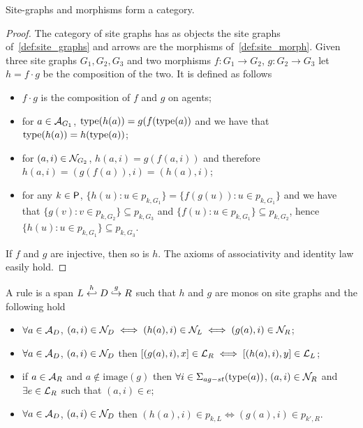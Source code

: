 \begin{lemma}
  Site-graphs and morphisms form a category.
\end{lemma}
\begin{proof}
  The category of site graphs has as objects the site graphs of~\autoref{def:site_graphs} and arrows are the morphisms of~\autoref{def:site_morph}.
%
  Given three site graphs $G_1,G_2,G_3$ and two morphisms $f:G_1\to G_2$, $g:G_2\to G_3$ let $h=f\cdot g$ be the composition of the two. It is defined as follows
  \begin{itemize}
  \item $f\cdot g$ is the composition of $f$ and $g$ on agents;
  \item for $a\in\mathcal{A}_{G_1}$, $\operatorname{type}(h(a))=g(f(\operatorname{type}(a))$ and we have that $\operatorname{type}(h(a))=h(\operatorname{type}(a))$;
  \item for $(a,i)\in\mathcal{N}_{G_2}$, $h(a,i) = g(f(a,i))$ and therefore $h(a,i)=(g(f(a)),i)=(h(a),i)$;
  \item for any $k\in\mathsf{P}$, $\{h(u): u\in p_{k,G_1}\}=\{f(g(u)): u\in p_{k,G_1}\}$ and we have that $\{g(v): v\in p_{k,G_2}\}\subseteq p_{k,G_3}$ and $\{f(u): u\in p_{k,G_1}\}\subseteq p_{k,G_2}$, hence $\{h(u): u\in p_{k,G_1}\}\subseteq p_{k,G_3}$.
  \end{itemize}
  If $f$ and $g$ are injective, then so is $h$.
%
  The axioms of associativity and identity law easily hold.
\end{proof}

\begin{definition}[Rules]
  \label{def:rule_site}
  A rule is a span $L\overset{h}{\hookleftarrow} D \overset{g}{\hookrightarrow} R$ such that $h$ and $g$ are monos on site graphs and the following hold
  \begin{itemize}
  \item $\forall a\in\mathcal{A}_D$, $(a,i)\in\mathcal{N}_D\iff (h(a),i)\in\mathcal{N}_L \iff (g(a),i)\in\mathcal{N}_R$;
  \item $\forall a\in\mathcal{A}_D$, $(a,i)\in\mathcal{N}_D$ then $[(g(a),i),x] \in\mathcal{L}_R \iff [(h(a),i),y] \in\mathcal{L}_L$;
  \item if $a\in\mathcal{A}_R$ and $a\notin\text{image}(g)$ then $\forall i\in\Sigma_{ag-st}(\operatorname{type}(a))$, $(a,i)\in\mathcal{N}_R$ and $\exists e\in \mathcal{L}_R$ such that $(a,i)\in e$;
  \item $\forall a\in\mathcal{A}_D$, $(a,i)\in\mathcal{N}_D$ then $(h(a),i)\in p_{k,L}\iff (g(a),i)\in p_{k',R}$.
  \end{itemize}
\end{definition}

